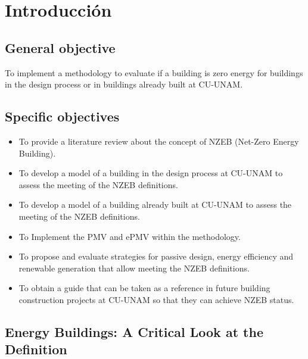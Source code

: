\chapter{Introducción}
\label{chap:introduccion}

\section{General objective}

To implement a methodology to evaluate if a building is zero energy for buildings in the design process or in buildings already built at CU-UNAM.


\section{Specific objectives}

\begin{itemize}

\item To provide a literature review about the concept of NZEB (Net-Zero Energy Building).

\item To develop a model of a building in the design process at CU-UNAM to assess the meeting of the NZEB definitions.

\item To develop a model of a building already built  at CU-UNAM to assess the meeting of the NZEB definitions.

\item To Implement the PMV and ePMV within the methodology.

\item To propose and evaluate strategies for passive design, energy efficiency and renewable generation that allow meeting the NZEB definitions.

\item To obtain a guide that can be taken as a reference in future building construction projects at CU-UNAM so that they can achieve NZEB status.

\end{itemize}


\section{Energy Buildings: A Critical Look at the Definition}

